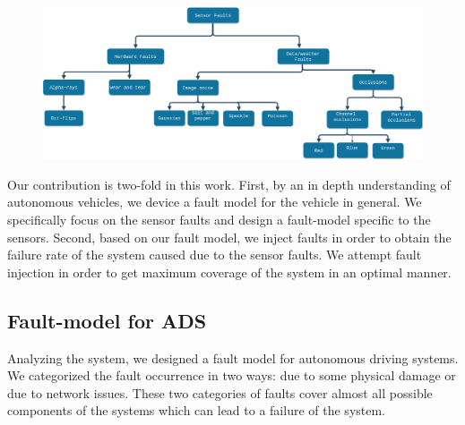 
 \begin{figure}
 	\centering
 	\includegraphics[width=0.7\linewidth]{finalFM}
 	\caption[Fault model for camera]{}
 	\label{fig:finalfm}
 \end{figure}
 


Our contribution is two-fold in this work. First, by an in depth understanding of autonomous vehicles, we device a fault model for the vehicle in general. We specifically focus on the sensor faults and design a fault-model specific to the sensors. Second, based on our fault model, we inject faults in order to obtain the failure rate of the system caused due to the sensor faults. We attempt fault injection in order to get maximum coverage of the system in an optimal manner.

\subsection{Fault-model for ADS}
Analyzing the system, we designed a fault model for autonomous driving systems. We categorized the fault occurrence in two ways: due to some physical damage or due to network issues. These two categories of faults cover almost all possible components of the systems which can lead to a failure of the system. 

